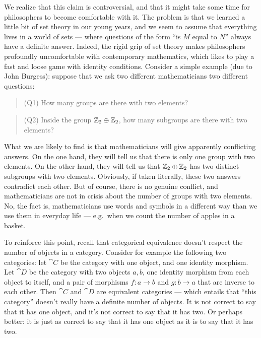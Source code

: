 We realize that this claim is controversial, and that it might take
some time for philosophers to become comfortable with it.  The problem
is that we learned a little bit of set theory in our young years, and
we seem to assume that everything lives in a world of sets --- where
questions of the form ``is $M$ equal to $N$'' always have a definite
answer.  Indeed, the rigid grip of set theory makes philosophers
profoundly uncomfortable with contemporary mathematics, which likes to
play a fast and loose game with identity conditions.  Consider a
simple example (due to John Burgess): suppose that we ask two
different mathematicians two different questions:
\begin{quote} (Q1) How many groups are there with two
  elements? \end{quote}
\begin{quote} (Q2) Inside the group $\mathbb Z _2\oplus \mathbb Z _2$, how many
  subgroups are there with two elements? \end{quote} What we are
likely to find is that mathematicians will give apparently conflicting
answers.  On the one hand, they will tell us that there is only one
group with two elements.  On the other hand, they will tell us that
$\mathbb Z _2\oplus \mathbb Z _2$ has two distinct subgroups with two elements.
Obviously, if taken literally, these two answers contradict each
other.  But of course, there is no genuine conflict, and
mathematicians are not in crisis about the number of groups with two
elements.  No, the fact is, mathematicians use words and symbols in a
different way than we use them in everyday life --- e.g.\ when we
count the number of apples in a basket.

To reinforce this point, recall that categorical equivalence doesn't
respect the number of objects in a category.  Consider for example the
following two categories: let $\cat{C}$ be the category with one
object, and one identity morphism.  Let $\cat{D}$ be the category with
two objects $a,b$, one identity morphism from each object to itself,
and a pair of morphisms $f:a\to b$ and $g:b\to a$ that are inverse to
each other.  Then $\cat{C}$ and $\cat{D}$ are equivalent categories
--- which entails that ``this category'' doesn't really have a
definite number of objects.  It is not correct to say that it has one
object, and it's not correct to say that it has two.  Or perhaps
better: it is just as correct to say that it has one object as it is
to say that it has two.

